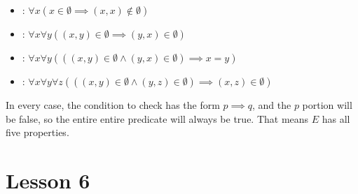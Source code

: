 \documentclass[11pt]{amsart}
\begin{document}
\begin{enumerate}
{\begin{itemize}
\item {}: $\forall x ( x\in \emptyset \implies (x,x)\not\in \emptyset)$\\[3pt]

\item{}: $\forall x \forall y( (x,y) \in \emptyset \implies (y,x)\in \emptyset)$\\[3pt]

\item{}: $\forall x\forall y ( ((x,y)\in \emptyset \land (y,x) \in \emptyset) \implies x=y)$\\[3pt]

\item{}: $\forall x \forall y\forall z( ((x,y)\in \emptyset \land (y,z)\in \emptyset) \implies (x,z)\in \emptyset)$\\[5pt]

\end{itemize}

In every case, the condition to check has the form $p\implies q$, and the $p$ portion will be false, so the entire
entire predicate will always be true. That means $E$ has all five properties.
}

\end{enumerate}

\section{Lesson 6}
\end{document}
